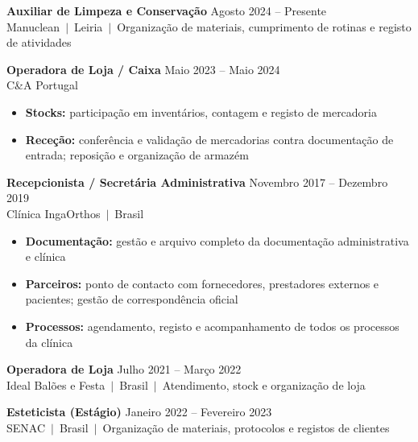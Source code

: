\documentclass[10pt,a4paper]{article}
\begin{document}
{\small\bfseries Auxiliar de Limpeza e Conservação}\hfill{\small\color{subtle} Agosto 2024 -- Presente}\\
{\small\color{accent} Manuclean~$|$~Leiria}~{\small\color{subtle}$|$~Organização de materiais, cumprimento de rotinas e registo de atividades}

\vspace{4pt}
{\small\bfseries Operadora de Loja / Caixa}\hfill{\small\color{subtle} Maio 2023 -- Maio 2024}\\
{\small\color{accent} C\&A Portugal}
\begin{itemize}\small
  \item \textbf{Stocks:} participação em inventários, contagem e registo de mercadoria
  \item \textbf{Receção:} conferência e validação de mercadorias contra documentação de entrada; reposição e organização de armazém
\end{itemize}

\vspace{4pt}
{\small\bfseries Recepcionista / Secretária Administrativa}\hfill{\small\color{subtle} Novembro 2017 -- Dezembro 2019}\\
{\small\color{accent} Clínica IngaOrthos~$|$~Brasil}
\begin{itemize}\small
  \item \textbf{Documentação:} gestão e arquivo completo da documentação administrativa e clínica
  \item \textbf{Parceiros:} ponto de contacto com fornecedores, prestadores externos e pacientes; gestão de correspondência oficial
  \item \textbf{Processos:} agendamento, registo e acompanhamento de todos os processos da clínica
\end{itemize}

\vspace{4pt}
{\small\bfseries Operadora de Loja}\hfill{\small\color{subtle} Julho 2021 -- Março 2022}\\
{\small\color{accent} Ideal Balões e Festa~$|$~Brasil}~{\small\color{subtle}$|$~Atendimento, stock e organização de loja}

\vspace{4pt}
{\small\bfseries Esteticista (Estágio)}\hfill{\small\color{subtle} Janeiro 2022 -- Fevereiro 2023}\\
{\small\color{accent} SENAC~$|$~Brasil}~{\small\color{subtle}$|$~Organização de materiais, protocolos e registos de clientes}

\end{document}
